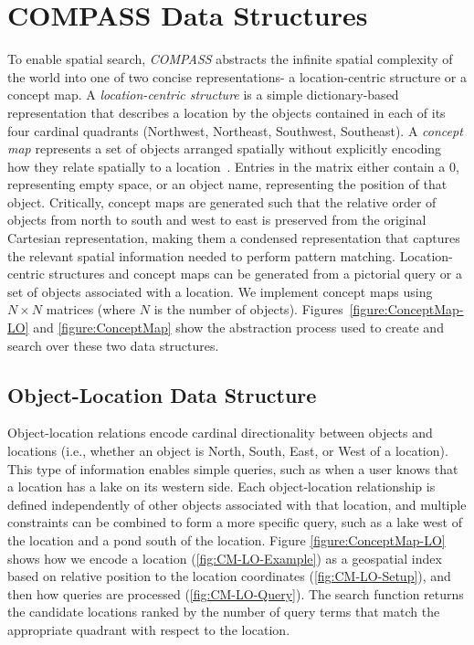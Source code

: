 \section{COMPASS Data Structures}
\label{section:data_structures}

To enable spatial search, \emph{COMPASS} abstracts the infinite spatial complexity of the world into one of two concise representations- a location-centric structure or a concept map.
A \textit{location-centric structure} is a simple dictionary-based representation that describes a location by the objects contained in each of its four cardinal quadrants (Northwest, Northeast, Southwest, Southeast).
A \textit{concept map} represents a set of objects arranged spatially without explicitly encoding how they relate spatially to a location~\cite{Xu2010}.
Entries in the matrix either contain a $0$, representing empty space, or an object name, representing the position of that object.
Critically, concept maps are generated such that the relative order of objects from north to south and west to east is preserved from the original Cartesian representation, making them a condensed representation that captures the relevant spatial information needed to perform pattern matching.
Location-centric structures and concept maps can be generated from a pictorial query or a set of objects associated with a location. 
We implement concept maps using $N \times N$ matrices (where $N$ is the number of objects).
Figures~\ref{figure:ConceptMap-LO} and \ref{figure:ConceptMap} show the abstraction process used to create and search over these two data structures.

\subsection{Object-Location Data Structure}
Object-location relations encode cardinal directionality between objects and locations (i.e., whether an object is North, South, East, or West of a location). 
This type of information enables simple queries, such as when a user knows that a location has a lake on its western side. 
Each object-location relationship is defined independently of other objects associated with that location, and multiple constraints can be combined to form a more specific query, such as a lake west of the location and a pond south of the location.
Figure \ref{figure:ConceptMap-LO} shows how we encode a location (\ref{fig:CM-LO-Example}) as a geospatial index based on relative position to the location coordinates (\ref{fig:CM-LO-Setup}), and then how queries are processed (\ref{fig:CM-LO-Query}).
The search function returns the candidate locations ranked by the number of query terms that match the appropriate quadrant with respect to the location. 

